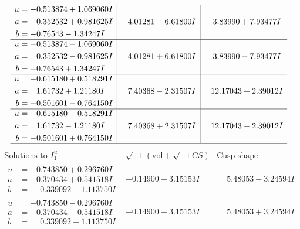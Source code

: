 \documentclass[1p]{elsarticle_modified}
\theoremstyle{definition}
\newcommand{\I}{\sqrt{-1}}
\begin{document}
$$\begin{array}{c|c|c}
\begin{aligned}
u &= -0.513874 + 1.069060 I \\
a &= \phantom{-}0.352532 + 0.981625 I \\
b &= -0.76543 - 1.34247 I\end{aligned}
 & \phantom{-}4.01281 - 6.61800 I & \phantom{-}3.83990 + 7.93477 I \\ \hline\begin{aligned}
u &= -0.513874 - 1.069060 I \\
a &= \phantom{-}0.352532 - 0.981625 I \\
b &= -0.76543 + 1.34247 I\end{aligned}
 & \phantom{-}4.01281 + 6.61800 I & \phantom{-}3.83990 - 7.93477 I \\ \hline\begin{aligned}
u &= -0.615180 + 0.518291 I \\
a &= \phantom{-}1.61732 + 1.21180 I \\
b &= -0.501601 - 0.764150 I\end{aligned}
 & \phantom{-}7.40368 - 2.31507 I & \phantom{-}12.17043 + 2.39012 I \\ \hline\begin{aligned}
u &= -0.615180 - 0.518291 I \\
a &= \phantom{-}1.61732 - 1.21180 I \\
b &= -0.501601 + 0.764150 I\end{aligned}
 & \phantom{-}7.40368 + 2.31507 I & \phantom{-}12.17043 - 2.39012 I\\
 \hline 
 \end{array}$$\newpage$$\begin{array}{c|c|c}  
\text{Solutions to }I^u_{1}& \I (\text{vol} + \sqrt{-1}CS) & \text{Cusp shape}\\
 \hline 
\begin{aligned}
u &= -0.743850 + 0.296760 I \\
a &= -0.370434 + 0.541518 I \\
b &= \phantom{-}0.339092 + 1.113750 I\end{aligned}
 & -0.14900 + 3.15153 I & \phantom{-}5.48053 - 3.24594 I \\ \hline\begin{aligned}
u &= -0.743850 - 0.296760 I \\
a &= -0.370434 - 0.541518 I \\
b &= \phantom{-}0.339092 - 1.113750 I\end{aligned}
 & -0.14900 - 3.15153 I & \phantom{-}5.48053 + 3.24594 I \\ \hline\begin{aligned}

\end{aligned}
\end{array}$$
\end{document}
